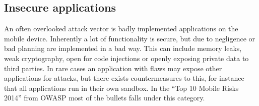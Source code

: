 \subsection{Insecure applications}
An often overlooked attack vector is badly implemented applications on the mobile device. Inherently a lot of functionality is secure, but due to negligence or bad planning are implemented in a bad way. This can include memory leaks, weak cryptography, open for code injections or openly exposing private data to third parties. In rare cases an application with flaws may expose other applications for attacks, but there exists countermeasures to this, for instance that all applications run in their own sandbox. In the ``Top 10 Mobile Risks 2014'' from OWASP \cite{OWASPTopTenMobile} most of the bullets falls under this category.
